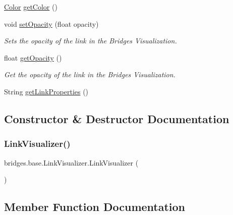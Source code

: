 \begin{DoxyCompactItemize}
\item 
\mbox{\hyperlink{classbridges_1_1base_1_1_color}{Color}} \mbox{\hyperlink{classbridges_1_1base_1_1_link_visualizer_a3ed52d98ecab99c6d8dd136fba913b7d}{get\+Color}} ()
\item 
void \mbox{\hyperlink{classbridges_1_1base_1_1_link_visualizer_ac0d59614dbc65ed0a19c25c493a1deaa}{set\+Opacity}} (float opacity)
\begin{DoxyCompactList}\small\item\em Sets the opacity of the link in the Bridges Visualization. \end{DoxyCompactList}\item 
float \mbox{\hyperlink{classbridges_1_1base_1_1_link_visualizer_a07cdd435a54e4b612ad63614f2a27a4a}{get\+Opacity}} ()
\begin{DoxyCompactList}\small\item\em Get the opacity of the link in the Bridges Visualization. \end{DoxyCompactList}\item 
String \mbox{\hyperlink{classbridges_1_1base_1_1_link_visualizer_ab64d9b7e2b99f7ebce80cbabfe4adf2a}{get\+Link\+Properties}} ()
\end{DoxyCompactItemize}


\subsection{Constructor \& Destructor Documentation}
\mbox{\label{classbridges_1_1base_1_1_link_visualizer_a0b69f099fa264ae9097b0efe278c6a1b}} 
\subsubsection{\texorpdfstring{LinkVisualizer()}{LinkVisualizer()}}
{\footnotesize\ttfamily bridges.\+base.\+Link\+Visualizer.\+Link\+Visualizer (\begin{DoxyParamCaption}{ }\end{DoxyParamCaption})}



\subsection{Member Function Documentation}
\mbox{\label{classbridges_1_1base_1_1_link_visualizer_a3ed52d98ecab99c6d8dd136fba913b7d}} 
